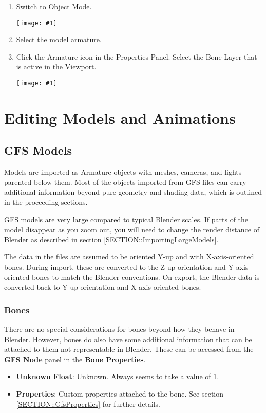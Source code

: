 \documentclass{article}
\newenvironment{guide}[1]
{
	\begin{center}
		\begin{tcolorbox}[%
			colback=black!20, 
			boxrule=0pt, 
			title=Step-by-step: #1,
			enhanced,
			breakable,
			overlay unbroken={%
                \draw[line width=1pt, black, rounded corners]
        	    (frame.north west) rectangle (frame.south east);
			},
    		overlay first={%
        		 \draw[line width=1pt, black, rounded corners]
        	    (frame.south west) -- (frame.north west) -- (frame.north east) -- (frame.south east);
                \draw[line width=1pt, black]
                (frame.south west) -- (frame.south east);
            },
    		overlay middle={%
                \draw[line width=1pt, black]
        	    (frame.north west) rectangle (frame.south east);
        	},
    		overlay last={%
                \draw[line width=1pt, black, rounded corners]
        	    (frame.north west) -- (frame.south west) -- (frame.south east) -- (frame.north east);
                \draw[line width=1pt, black]
                (frame.north west) -- (frame.north east);
           	}
        ]{}
    	\begin{enumerate}
}
{
    		\end{enumerate}
    	\end{tcolorbox}
	\end{center}  	 
}
\newcommand{\guideimage}[1]
{
	\begin{center}
		\texttt{[image: \#1]}
	\end{center}
}
\begin{document}
\begin{guide}{Selecting Bone Layers}
\item Switch to Object Mode.
\guideimage{images/import/import_to_object_mode.png}
\item Select the model armature.
\item Click the Armature icon in the Properties Panel. Select the Bone Layer that is active in the Viewport.
\guideimage{images/import/import_bone_layer_select.png}
\end{guide}

\clearpage

\section{Editing Models and Animations}
\subsection{GFS Models}
Models are imported as Armature objects with meshes, cameras, and lights parented below them. Most of the objects imported from GFS files can carry additional information beyond pure geometry and shading data, which is outlined in the proceeding sections.

GFS models are very large compared to typical Blender scales. If parts of the model disappear as you zoom out, you will need to change the render distance of Blender as described in section \ref{SECTION::ImportingLargeModels}.

The data in the files are assumed to be oriented Y-up and with X-axis-oriented bones. During import, these are converted to the Z-up orientation and Y-axis-oriented bones to match the Blender conventions. On export, the Blender data is converted back to Y-up orientation and X-axis-oriented bones. 

\subsubsection{Bones}
\label{SECTION::EditingBones} 
There are no special considerations for bones beyond how they behave in Blender. However, bones do also have some additional information that can be attached to them not representable in Blender. These can be accessed from the \textbf{GFS Node} panel in the \textbf{Bone Properties}.

\begin{itemize}
\item \textbf{Unknown Float}: Unknown. Always seems to take a value of 1.
\item \textbf{Properties}: Custom properties attached to the bone. See section \ref{SECTION::GfsProperties} for further details.
\end{itemize}
\end{document}
